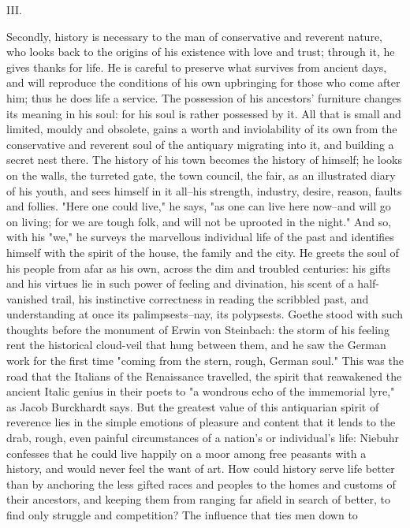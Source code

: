 III.

Secondly, history is necessary to the man of conservative and
reverent nature, who looks back to the origins of his existence with
love and trust; through it, he gives thanks for life. He is careful
to preserve what survives from ancient days, and will reproduce the
conditions of his own upbringing for those who come after him; thus
he does life a service. The possession of his ancestors' furniture
changes its meaning in his soul: for his soul is rather possessed by
it. All that is small and limited, mouldy and obsolete, gains a worth
and inviolability of its own from the conservative and reverent soul
of the antiquary migrating into it, and building a secret nest there.
The history of his town becomes the history of himself; he looks on
the walls, the turreted gate, the town council, the fair, as an
illustrated diary of his youth, and sees himself in it all--his
strength, industry, desire, reason, faults and follies. "Here one
could live," he says, "as one can live here now--and will go on
living; for we are tough folk, and will not be uprooted in the
night." And so, with his "we," he surveys the marvellous individual
life of the past and identifies himself with the spirit of the house,
the family and the city. He greets the soul of his people from afar
as his own, across the dim and troubled centuries: his gifts and his
virtues lie in such power of feeling and divination, his scent of a
half-vanished trail, his instinctive correctness in reading the
scribbled past, and understanding at once its palimpsests--nay, its
polypsests. Goethe stood with such thoughts before the monument of
Erwin von Steinbach: the storm of his feeling rent the historical
cloud-veil that hung between them, and he saw the German work for the
first time "coming from the stern, rough, German soul." This was the
road that the Italians of the Renaissance travelled, the spirit that
reawakened the ancient Italic genius in their poets to "a wondrous
echo of the immemorial lyre," as Jacob Burckhardt says. But the
greatest value of this antiquarian spirit of reverence lies in the
simple emotions of pleasure and content that it lends to the drab,
rough, even painful circumstances of a nation's or individual's life:
Niebuhr confesses that he could live happily on a moor among free
peasants with a history, and would never feel the want of art. How
could history serve life better than by anchoring the less gifted
races and peoples to the homes and customs of their ancestors, and
keeping them from ranging far afield in search of better, to find
only struggle and competition? The influence that ties men down to

